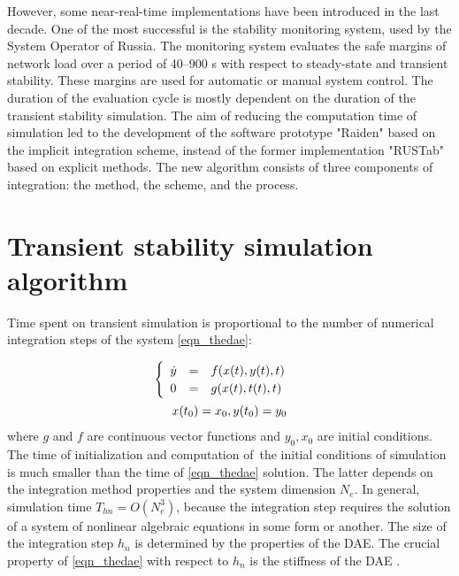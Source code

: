 \documentclass[lettersize,journal]{IEEEtran}
\begin{document}
However, some near-real-time implementations have been introduced in the last decade. One of the most successful is the stability monitoring system, used by the System Operator of Russia. The monitoring system evaluates the safe margins of network load over a period of 40–900 s with respect to steady-state and transient stability. These margins are used for automatic or manual system control. The duration of the evaluation cycle is mostly dependent on the duration of the transient stability simulation. The aim of reducing the computation time of simulation led to the development of the software prototype "Raiden" based on the implicit integration scheme, instead of the former implementation "RUSTab" based on explicit methods. The new algorithm consists of three components of integration: the method, the scheme, and the process. 
\section{Transient stability simulation algorithm}
Time spent on transient simulation is proportional to the number of numerical integration steps of the system \eqref{eqn_thedae}: 

\begin{equation}
	\label{eqn_thedae}
	\begin{array}{c}
		\begin{cases}
			\begin{array}{lcl}
				\dot{y}&=&f(x(t), y(t), t) \\
			 	      0&=&g(x(t), t(t), t)\\
			\end{array}
		\end{cases} 
	\vspace{0.5em} \\
	 x(t_0)=x_0, y(t_0)=y_0 \\
	\end{array}
\end{equation}
\noindent where \(g\) and \(f\) are continuous vector functions and \(y_0, x_0\) are initial conditions. The time of initialization and computation of the initial conditions of simulation is much smaller than the time of \eqref{eqn_thedae} solution. The latter depends on the integration method properties and the system dimension \(N_e\). In general, simulation time \(T_{hn}=O(N_e^3)\), because the integration step requires the solution of a system of nonlinear algebraic equations in some form or another. The size of the integration step \(h_n\) is determined by the properties of the DAE. The crucial property of \eqref{eqn_thedae} with respect to \(h_n\) is the stiffness of the DAE \cite{hairer93}. 
\end{document}
